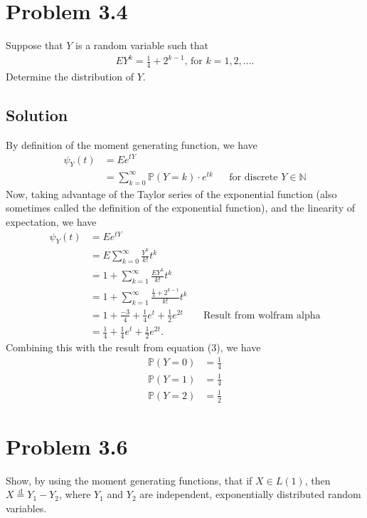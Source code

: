\documentclass[10pt,a4paper]{article}
\theoremstyle{theorem}
\theoremstyle{definition}
\newcommand{\Prob}{\mathbb{P}}
\begin{document}
\section*{Problem 3.4}
Suppose that $Y$ is a random variable such that 
\begin{align*}
EY^k = \frac{1}{4} + 2^{k-1} \text{, for } k=1,2,....
\end{align*}
Determine the distribution of $Y$.

\subsection*{Solution}
By definition of the moment generating function, we have
\begin{align}
\psi_Y(t) &= E e^{tY}\\
&= \sum_{k = 0}^\infty \Prob(Y = k) \cdot e^{tk} && \text{for discrete } Y \in \mathbb{N}
\end{align}
Now, taking advantage of the Taylor series of the exponential function (also sometimes called the definition of the exponential function), and the linearity of expectation, we have
\begin{align*}
\psi_Y(t) &= E e^{tY}\\
&= E \sum_{k=0}^\infty \frac{Y^k}{k!}t^k\\
&= 1 + \sum_{k=1}^\infty \frac{EY^k}{k!}t^k\\
&= 1 + \sum_{k=1}^\infty \frac{\frac{1}{4} + 2^{k-1}}{k!}t^k\\
&= 1 + \frac{-3}{4} + \frac{1}{4} e^t + \frac{1}{2}e^{2t} && \text{Result from wolfram alpha}\\
&= \frac{1}{4} + \frac{1}{4} e^t + \frac{1}{2}e^{2t}.
\end{align*}
Combining this with the result from equation (3), we have
\begin{align*}
\Prob(Y = 0) &= \boxed{\frac{1}{4}}\\
\Prob(Y = 1) &= \boxed{\frac{1}{4}}\\
\Prob(Y = 2) &= \boxed{\frac{1}{2}}
\end{align*}

\section*{Problem 3.6}
Show, by using the moment generating functions, that if $X \in L(1)$,  then $X \stackrel{\text{d}}{=} Y_1 - Y_2$, where $Y_1$ and $Y_2$ are independent, exponentially distributed random variables.
\end{document}
